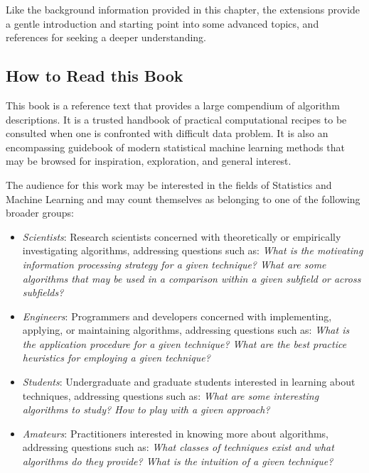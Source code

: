 Like the background information provided in this chapter, the extensions provide a gentle introduction and starting point into some advanced topics, and references for seeking a deeper understanding.

\subsection{How to Read this Book}
This book is a reference text that provides a large compendium of algorithm descriptions. 
It is a trusted handbook of practical computational recipes to be consulted when one is confronted with difficult data problem. It is also an encompassing guidebook of modern statistical machine learning methods that may be browsed for inspiration, exploration, and general interest.

The audience for this work may be interested in the fields of Statistics and Machine Learning and may count themselves as belonging to one of the following broader groups:

\begin{itemize}
	\item \emph{Scientists}: Research scientists concerned with theoretically or empirically investigating algorithms, addressing questions such as: \emph{What is the motivating information processing strategy for a given technique? What are some algorithms that may be used in a comparison within a given subfield or across subfields?}
	\item \emph{Engineers}: Programmers and developers concerned with implementing, applying, or maintaining algorithms, addressing questions such as: \emph{What is the application procedure for a given technique? What are the best practice heuristics for employing a given technique?}
	\item \emph{Students}: Undergraduate and graduate students interested in learning about techniques, addressing questions such as: \emph{What are some interesting algorithms to study? How to play with a given approach?}
	\item \emph{Amateurs}: Practitioners interested in knowing more about algorithms, addressing questions such as: \emph{What classes of techniques exist and what algorithms do they provide? What is the intuition of a given technique?}
\end{itemize}
